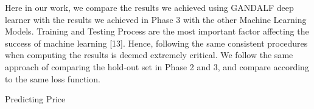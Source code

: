 \documentclass[a4paper,12pt]{article}
\begin{document}
Here in our work, we compare the results we achieved using GANDALF deep learner with the results we achieved in Phase 3 with the other Machine Learning Models. Training and Testing Process are the most important factor affecting the success of machine learning [13]. Hence, following the same consistent procedures when computing the results is deemed extremely critical. We follow the same approach of comparing the hold-out set in Phase 2 and 3, and compare according to the same loss function.

\begin{table}[ht]
\centering
\begin{minipage}[t]{0.45\linewidth}
\centering
\small
{}
\caption{Predicting Price}
\label{tab:metrics_price}
\end{minipage}%
\hfill
\begin{minipage}[t]{0.45\linewidth}
\centering
\small
{}
\caption{Predicting Minimum Nights}
\label{tab:metrics_min_nights}
\end{minipage}
\end{table}
\end{document}
